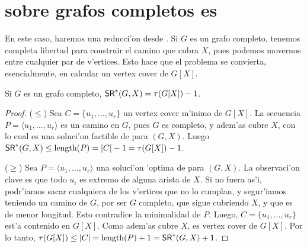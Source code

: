 \section{ sobre grafos completos es }

En este caso, haremos una reducci'on desde . Si $G$ es un grafo completo, tenemos completa libertad para construir el camino que cubra $X$, pues podemos movernos entre cualquier par de v'ertices. Esto hace que el problema se convierta, esencialmente, en calcular un vertex cover de $G[X]$.

\begin{lemma}
\label{le:sr_tau}
Si $G$ es un grafo completo, $\textnormal{\textsf{SR}}^*(G, X) = \tau(G[X]) - 1$.

\begin{proof}
($\leq$) Sea $C = \{u_1, \dots, u_r\}$ un vertex cover m'inimo de $G[X]$. La secuencia $P = \langle u_1, \dots, u_r \rangle$ es un camino en $G$, pues $G$ es completo, y adem'as cubre $X$, con lo cual es una soluci'on factible de  para $(G, X)$. Luego $\textnormal{\textsf{SR}}^*(G, X) \leq \textnormal{length}(P) = |C| - 1 = \tau(G[X]) - 1$.

($\geq$) Sea $P = \langle u_1, \dots, u_r \rangle$ una soluci'on 'optima de  para $(G, X)$. La observaci'on clave es que todo $u_i$ es extremo de alguna arista de $X$. Si no fuera as'i, podr'iamos sacar cualquiera de los v'ertices que no lo cumplan, y segur'iamos teniendo un camino de $G$, por ser $G$ completo, que sigue cubriendo $X$, y que es de menor longitud. Esto contradice la minimalidad de $P$. Luego, $C = \{u_1, \dots, u_r\}$ est'a contenido en $G[X]$. Como adem'as cubre $X$, es vertex cover de $G[X]$. Por lo tanto, $\tau(G[X]) \leq |C| = \textnormal{length}(P) + 1 = \textnormal{\textsf{SR}}^*(G, X) + 1$.
\end{proof}
\end{lemma}

